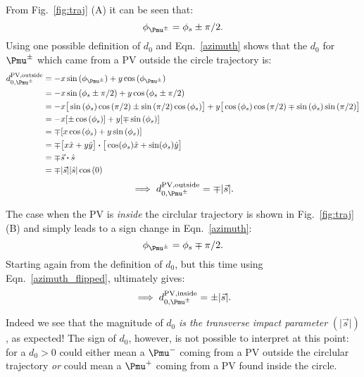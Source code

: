 From Fig.~\ref{fig:traj} (A) it can be seen that:
\begin{equation}
    \label{azimuth}
\phi_{\Pmu^{\pm}} = \phi_{s} \pm \pi/2.
\end{equation}
Using one possible definition of $d_{0}$ and Eqn.~\ref{azimuth} shows that 
the $d_0$ for $\Pmu^{\pm}$ which came from a PV outside the circle trajectory is:
\begin{align*}
    d_{0,\Pmu^{\pm}}^{\text{PV,outside}} &= -x \sin{( \phi_{\Pmu^{\pm}} )}  + y \cos{( \phi_{\Pmu^{\pm}} )} \\
    &= - x \sin{( \phi_s \pm \pi/2 )} + y \cos{( \phi_s \pm \pi/2 )}  \\
    &= -x \big[ \sin{(\phi_s)} \cos{(\pi/2)}  \pm \sin{(\pi/2)} \cos{(\phi_s)} \big]  
       + y \big[\cos{(\phi_s)} \cos{(\pi/2)} \mp \sin{(\phi_s)} \sin{(\pi/2)} \big] \\
    &= - x [\pm \cos{(\phi_s)}] + y [\mp \sin{(\phi_s)}] \\
    &= \mp [x \cos{(\phi_s)}  + y \sin{(\phi_s)}] \\
    &= \mp \big[ x \hat{x} + y \hat{y}  \big] \boldsymbol{\cdot} \big[ \cos(\phi_{s}) \hat{x} + \sin(\phi_{s}) \hat{y}  \big] \\
    &= \mp \vec{s} \boldsymbol{\cdot} \hat{s} \\
    &= \mp \lvert \vec{s} \rvert   \lvert \hat{s} \rvert    \cos{(0)}
\end{align*}
\begin{equation}
    \label{eqn:d0_out}
    \implies  d_{0,\Pmu^{\pm}}^{\text{PV,outside}} = \mp \lvert \vec{s} \rvert. 
\end{equation}

The case when the PV is \textit{inside} the circlular trajectory is shown in Fig.~\ref{fig:traj} (B) and simply leads to a sign change in Eqn.~\ref{azimuth}:
\begin{equation}
    \label{azimuth_flipped}
\phi_{\Pmu^{\pm}} = \phi_{s} \mp \pi/2.
\end{equation}
Starting again from the definition of $d_0$, but this time using Eqn.~\ref{azimuth_flipped}, ultimately gives:
\begin{equation}
    \label{eqn:d0_in}
\implies  d_{0,\Pmu^{\pm}}^{\text{PV,inside}} = \pm \lvert \vec{s} \rvert.
\end{equation}

Indeed we see that the magnitude of $d_0$ \textit{is the transverse impact parameter} $(\lvert \vec{s} \rvert)$, as expected!
The sign of $d_0$, however, is not possible to interpret at this point: 
for a $d_0 > 0$ could either mean a $\Pmu^-$ coming from a PV outside the circlular trajectory \emph{or}
could mean a $\Pmu^+$ coming from a PV found inside the circle.

